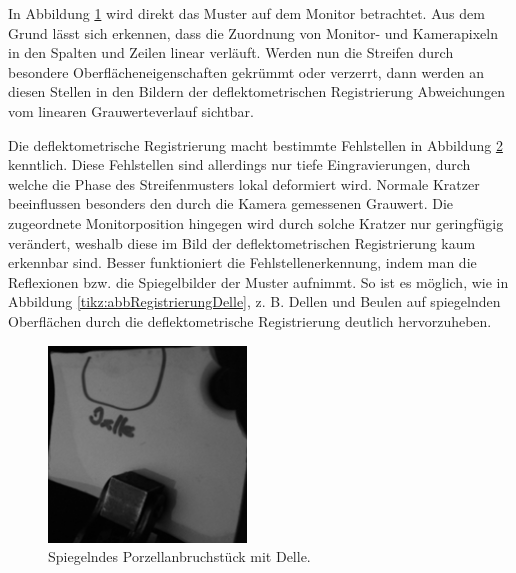 {
	\begin{figure}[H]
		\centering
		
		\label{tikz:abbOptimaleSpaltenZeilenReg}
	\end{figure}
}

\noindent
In Abbildung \ref{tikz:abbOptimaleSpaltenZeilenReg} wird direkt das Muster auf dem Monitor betrachtet.
Aus dem Grund lässt sich erkennen, dass die Zuordnung von Monitor- und Kamerapixeln in den Spalten und Zeilen linear verläuft.
Werden nun die Streifen durch besondere Oberflächeneigenschaften gekrümmt oder verzerrt, dann werden an diesen Stellen in den Bildern der deflektometrischen Registrierung Abweichungen vom linearen Grauwerteverlauf sichtbar.

{
	\begin{figure}[H]
		\centering
		
		\label{tikz:abbBrillenglasRegistrierung}
	\end{figure}
}

\noindent
Die deflektometrische Registrierung macht bestimmte Fehlstellen in Abbildung \ref{tikz:abbBrillenglasRegistrierung} kenntlich.
Diese Fehlstellen sind allerdings nur tiefe Eingravierungen, durch welche die Phase des Streifenmusters lokal deformiert wird.
Normale Kratzer beeinflussen besonders den durch die Kamera gemessenen Grauwert.
Die zugeordnete Monitorposition hingegen wird durch solche Kratzer nur geringfügig verändert, weshalb diese im Bild der deflektometrischen Registrierung kaum erkennbar sind.
Besser funktioniert die Fehlstellenerkennung, indem man die Reflexionen bzw. die Spiegelbilder der Muster aufnimmt.
So ist es möglich, wie in Abbildung \ref{tikz:abbRegistrierungDelle}, z. B. Dellen und Beulen auf spiegelnden Oberflächen durch die deflektometrische Registrierung deutlich hervorzuheben.

{
	\begin{figure}[H]
		\centering
		\includegraphics[width = 0.47\textwidth]{04_deflektometrischeRegistrierung/auswertungDeflektometrischeRegistrierung/figures/delleBeleuchtet}
		\caption[Spiegelndes Porzellanbruchstück mit Delle]{Spiegelndes Porzellanbruchstück mit Delle.}
		\label{img:objektMitDelle}
	\end{figure}
}

